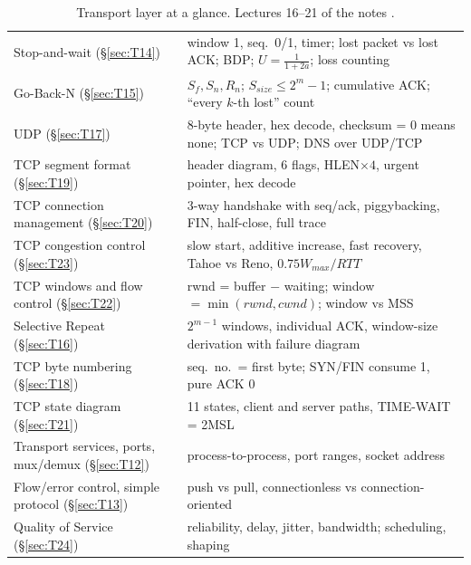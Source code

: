 \begin{table}[H]\centering\footnotesize\zebra
\begin{tabularx}{\linewidth}{L{48mm}cY}\toprule
{} &  & \\\midrule
Stop-and-wait (\S\ref{sec:T14}) &  & window 1, seq.\ 0/1, timer; lost packet vs lost ACK; BDP; $U=\frac{1}{1+2a}$; loss counting\\
Go-Back-N (\S\ref{sec:T15}) &  & $S_f,S_n,R_n$; $S_{size}\le 2^m-1$; cumulative ACK; ``every $k$-th lost'' count\\
UDP (\S\ref{sec:T17}) &  & 8-byte header, hex decode, checksum = 0 means none; TCP vs UDP; DNS over UDP/TCP\\
TCP segment format (\S\ref{sec:T19}) &  & header diagram, 6 flags, HLEN$\times4$, urgent pointer, hex decode\\
TCP connection management (\S\ref{sec:T20}) &  & 3-way handshake with seq/ack, piggybacking, FIN, half-close, full trace\\
TCP congestion control (\S\ref{sec:T23}) &  & slow start, additive increase, fast recovery, Tahoe vs Reno, $0.75W_{max}/RTT$\\
TCP windows and flow control (\S\ref{sec:T22}) &  & rwnd = buffer $-$ waiting; window $=\min(rwnd,cwnd)$; window vs MSS\\
Selective Repeat (\S\ref{sec:T16}) &  & $2^{m-1}$ windows, individual ACK, window-size derivation with failure diagram\\
TCP byte numbering (\S\ref{sec:T18}) &  & seq.\ no.\ = first byte; SYN/FIN consume 1, pure ACK 0\\
TCP state diagram (\S\ref{sec:T21}) &  & 11 states, client and server paths, TIME-WAIT = 2MSL\\
Transport services, ports, mux/demux (\S\ref{sec:T12}) &  & process-to-process, port ranges, socket address\\
Flow/error control, simple protocol (\S\ref{sec:T13}) &  & push vs pull, connectionless vs connection-oriented\\
Quality of Service (\S\ref{sec:T24}) &  & reliability, delay, jitter, bandwidth; scheduling, shaping\\\bottomrule
\end{tabularx}
\caption{Transport layer at a glance. Lectures 16--21 of the notes .}
\end{table}


